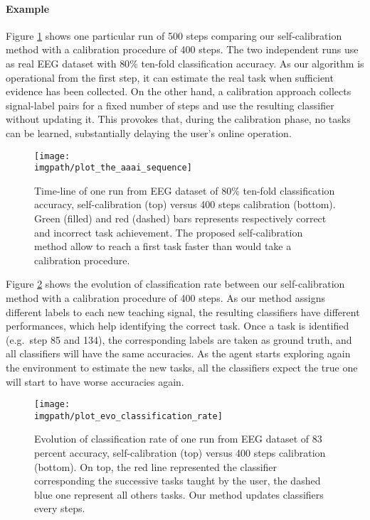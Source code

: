 \paragraph{Example}
Figure \ref{fig:sequence} shows one particular run of 500 steps comparing our self-calibration method with a calibration procedure of 400 steps. The two independent runs use as real EEG dataset with $80\%$ ten-fold classification accuracy. As our algorithm is operational from the first step, it can estimate the real task when sufficient evidence has been collected. On the other hand, a calibration approach collects signal-label pairs for a fixed number of steps and use the resulting classifier without updating it. This provokes that, during the calibration phase, no tasks can be learned, substantially delaying the user's online operation.

\begin{figure}[!h]
\centering
\texttt{[image: \\imgpath/plot\_the\_aaai\_sequence]}
\caption{Time-line of one run from EEG dataset of $80\%$ ten-fold classification accuracy, self-calibration (top) versus 400 steps calibration (bottom). Green (filled) and red (dashed) bars represents respectively correct and incorrect task achievement. The proposed self-calibration method allow to reach a first task faster than would take a calibration procedure.}
\label{fig:sequence}
\end{figure} 



Figure \ref{fig:sequence_evolution} shows the evolution of classification rate between our self-calibration method with a calibration procedure of 400 steps. As our method assigns different labels to each new teaching signal, the resulting classifiers have different performances, which help identifying the correct task. Once a task is identified (e.g.\ step 85 and 134), the corresponding labels are taken as ground truth, and all classifiers will have the same accuracies. As the agent starts exploring again the environment to estimate the new tasks, all the classifiers expect the true one will start to have worse accuracies again.

\begin{figure}[!h]
\centering
\texttt{[image: \\imgpath/plot\_evo\_classification\_rate]}
\caption{Evolution of classification rate of one run from EEG dataset of 83 percent accuracy, self-calibration (top) versus 400 steps calibration (bottom). On top, the red line represented the classifier corresponding the successive tasks taught by the user, the dashed blue one represent all others tasks. Our method updates classifiers every steps.}
\label{fig:sequence_evolution}
\end{figure} 

